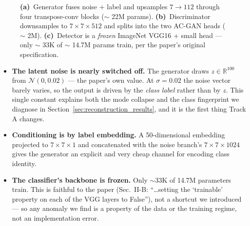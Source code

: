 \documentclass[11pt]{article}
\begin{document}
\begin{figure}[htbp]
{}
\caption{\textbf{(a)}~Generator fuses noise + label and upsamples  $7{\to}112$  through four transpose-conv blocks ($\sim$ 22M params). \textbf{(b)}~Discriminator downsamples to  $7{\times}7{\times}512$  and splits into the two AC-GAN heads ($\sim$ 2M). \textbf{(c)}~Detector is a \emph{frozen} ImageNet VGG16 + small head --- only  $\sim$ 33K of  $\sim$ 14.7M params train, per the paper's original specification.}
\label{fig:arch}
\end{figure}

\begin{itemize}[nosep, leftmargin=1.5em]
  \item \textbf{The latent noise is nearly switched off.} The generator draws $z \in \mathbb{R}^{100}$ from $\mathcal{N}(0, 0.02)$ --- the paper's own value. At $\sigma = 0.02$ the noise vector barely varies, so the output is driven by the \emph{class label} rather than by $z$. This single constant explains both the mode collapse and the class fingerprint we diagnose in Section~\ref{sec:reconstruction_results}, and it is the first thing Track A changes.
  \item \textbf{Conditioning is by label embedding.} A 50-dimensional embedding projected to $7{\times}7{\times}1$ and concatenated with the noise branch's $7{\times}7{\times}1024$ gives the generator an explicit and very cheap channel for encoding class identity.
  \item \textbf{The classifier's backbone is frozen.} Only $\sim$33K of 14.7M parameters train. This is faithful to the paper (Sec.~II-B: ``\ldots setting the `trainable' property on each of the VGG layers to False''), not a shortcut we introduced --- so any anomaly we find is a property of the data or the training regime, not an implementation error.
\end{itemize}
\end{document}
